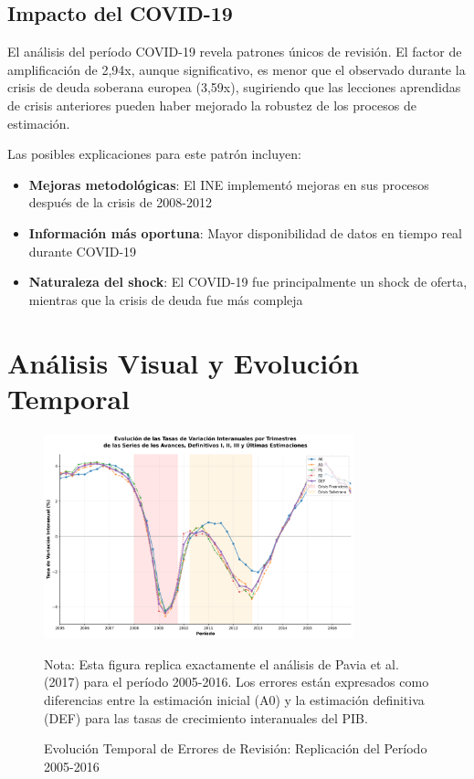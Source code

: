 \documentclass{article}
\begin{document}
\subsection{Impacto del COVID-19}

El análisis del período COVID-19 revela patrones únicos de revisión. El factor de amplificación de 2,94x, aunque significativo, es menor que el observado durante la crisis de deuda soberana europea (3,59x), sugiriendo que las lecciones aprendidas de crisis anteriores pueden haber mejorado la robustez de los procesos de estimación.

Las posibles explicaciones para este patrón incluyen:

\begin{itemize}
\item \textbf{Mejoras metodológicas}: El INE implementó mejoras en sus procesos después de la crisis de 2008-2012
\item \textbf{Información más oportuna}: Mayor disponibilidad de datos en tiempo real durante COVID-19
\item \textbf{Naturaleza del shock}: El COVID-19 fue principalmente un shock de oferta, mientras que la crisis de deuda fue más compleja
\end{itemize}

\section{Análisis Visual y Evolución Temporal}

\begin{figure}[h]
\centering
\includegraphics[width=0.8\textwidth]{../figuras/figura_2_pavia_robusta_2005_2016.png}
\caption{Evolución Temporal de Errores de Revisión: Replicación del Período 2005-2016}
\label{fig:evolucion_2005_2016}
\begin{flushleft}
\footnotesize
Nota: Esta figura replica exactamente el análisis de Pavia et al. (2017) para el período 2005-2016. Los errores están expresados como diferencias entre la estimación inicial (A0) y la estimación definitiva (DEF) para las tasas de crecimiento interanuales del PIB.
\end{flushleft}
\end{figure}
\end{document}
